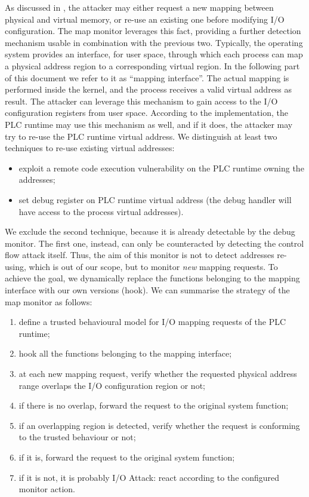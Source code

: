As discussed in , the attacker may either request a new mapping between physical and virtual memory, or re-use an existing one before
modifying I/O configuration. The map monitor leverages this fact, providing a further detection mechanism usable in combination with the previous two.
Typically, the operating system provides an interface, for user space, through which each process can map a physical address region to a corresponding virtual region.
In the following part of this document we refer to it as ``mapping interface''.
The actual mapping is performed inside the kernel, and the process receives a valid virtual address as result.
The attacker can leverage this mechanism to gain access to the I/O configuration registers from user space.
According to the implementation, the PLC runtime may use this mechanism as well, and if it does, the attacker may try to re-use the PLC runtime virtual address.
We distinguish at least two techniques to re-use existing virtual addresses:
\begin{itemize}
	\item exploit a remote code execution vulnerability on the PLC runtime owning the addresses;
	\item set debug register on PLC runtime virtual address (the debug handler will have access to the process virtual addresses).
\end{itemize}
We exclude the second technique, because it is already detectable by the debug monitor. The first one, instead, can only be counteracted by detecting the control flow attack itself.
Thus, the aim of this monitor is not to detect addresses re-using, which is out of our scope, but to monitor \emph{new} mapping requests.
To achieve the goal, we dynamically replace the functions belonging to the mapping interface with our own versions (hook).
We can summarise the strategy of the map monitor as follows:
\begin{enumerate}
	\item \label{enum:map-model} define a trusted behavioural model for I/O mapping requests of the PLC runtime;
	\item hook all the functions belonging to the mapping interface;
	\item at each new mapping request, verify whether the requested physical address range overlaps the I/O configuration region or not;
	\item if there is no overlap, forward the request to the original system function;
	\item if an overlapping region is detected, verify whether the request is conforming to the trusted behaviour or not;
	\item if it is, forward the request to the original system function;
	\item if it is not, it is probably I/O Attack: react according to the configured monitor action.
\end{enumerate}
